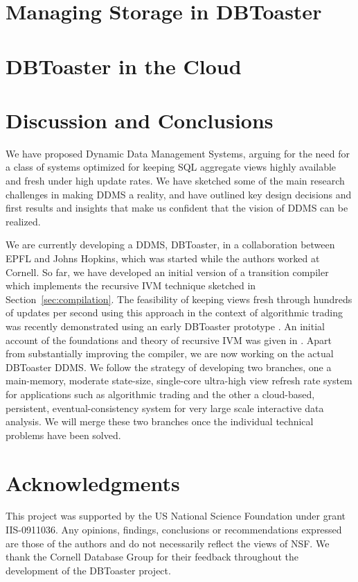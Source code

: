 \documentclass{sig-alternate}
\begin{document}
\section{Managing Storage in DBToaster}
\label{sec:storage}



\section{DBToaster in the Cloud}
\label{sec:distribution}


\section{Discussion and Conclusions}
\label{sec:conclusion}

We have proposed Dynamic Data Management Systems,
arguing for the need for a class of systems optimized
for keeping SQL aggregate views highly available and fresh under
high update rates.
We have sketched some of the main research challenges in
making DDMS a reality, and have outlined key design decisions
and first results and insights that make us confident that
the vision of DDMS can be realized.

We are currently developing a DDMS, DBToaster, in a collaboration
between EPFL and Johns Hopkins, which was started while the
authors worked at Cornell.
%
So far, we have developed an initial version of a
transition compiler which implements the recursive IVM technique
sketched in Section~\ref{sec:compilation}. The feasibility of
keeping views fresh through hundreds of updates per second using
this approach in the context of algorithmic trading
was recently demonstrated using an early DBToaster prototype
\cite{ahmad-vldb:09}. An initial account of the foundations and
theory of recursive IVM was given in \cite{koch-pods:10}.
Apart from substantially improving the compiler,
we are now working on the actual DBToaster DDMS. We follow the
strategy of developing two branches, one a main-memory, moderate
state-size, single-core ultra-high view refresh rate system for
applications such as algorithmic trading and the other
a cloud-based, persistent, eventual-consistency system for
very large scale interactive data analysis. We will
merge these two branches once the individual technical
problems have been solved.


\section*{Acknowledgments}


This project was supported by the US National Science Foundation under grant
IIS-0911036. Any opinions, findings, conclusions or recommendations expressed
are those of the authors and do not necessarily reflect the views of NSF.
We thank the Cornell Database Group for their feedback throughout the
development of the DBToaster project.




\end{document}
